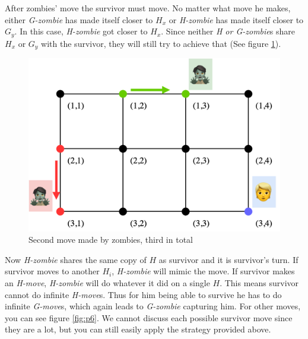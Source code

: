 \documentclass[1p]{elsarticle}
\begin{document}
After zombies' move the survivor must move. No matter what move he makes, either {\it G-zombie} has made itself closer
to $H_x$ or {\it H-zombie} has made itself closer to $G_y$. In this case, {\it H-zombie} got closer to $H_x$. Since
neither {\it H or G-zombie}s share $H_x$ or $G_y$ with the survivor, they will still try to achieve that (See figure \ref{fig:p5}).

\begin{figure}[h!]
	\centering
	\includegraphics[width=0.5\linewidth]{fig/p34m3.png}
	\caption{Second move made by zombies, third in total}
	\label{fig:p5}
\end{figure}

Now {\it H-zombie} shares the same copy of $H$ as survivor and it is survivor's turn. If survivor moves to another $H_i$,
{\it H-zombie} will mimic the move. If survivor makes an {\it H-move}, {\it H-zombie} will do whatever it did on a
single $H$. This means survivor cannot do infinite {\it H-move}s. Thus for him being able to survive he has to do
infinite {\it G-move}s, which again leads to {\it G-zombie} capturing him. For other moves, you can see
figure \ref{fig:p6}. We cannot discuss each possible survivor move since they are a lot, but you can still easily apply
the strategy provided above. 
\end{document}
